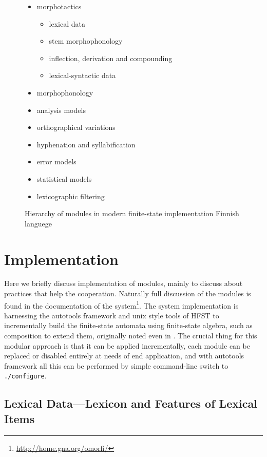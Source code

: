 \documentclass[11pt]{article}
\begin{document}
\begin{figure}[h]
\begin{centering}
\caption{Hierarchy of modules in modern finite-state implementation Finnish languege
\label{fig:modules}}
\end{centering}
\begin{scriptsize}
\begin{itemize}
\item morphotactics \begin{itemize}
    \item lexical data
    \item stem morphophonology
    \item inflection, derivation and compounding
    \item lexical-syntactic data
\end{itemize}
\item morphophonology
\item analysis models
\item orthographical variations
\item hyphenation and syllabification
\item error models
\item statistical models
\item lexicographic filtering
\end{itemize}
\end{scriptsize}
\end{figure}

\section{Implementation}
\label{sec:implementation}

Here we briefly discuss implementation of modules, mainly to discuss
about practices that help the cooperation. Naturally full discussion of the
modules is found in the documentation of the
system\footnote{\url{http://home.gna.org/omorfi/}}. The system
implementation is harnessing the autotools framework and unix style tools of
HFST to incrementally build the finite-state automata using finite-state
algebra, such as composition to extend them, originally noted even in
. The crucial thing for this modular approach is that it
can be applied incrementally, each module can be replaced or disabled entirely
at needs of end application, and with autotools framework all this
can be performed by simple command-line switch to \verb|./configure|.

\subsection{Lexical Data---Lexicon and Features of Lexical Items}
\end{document}
